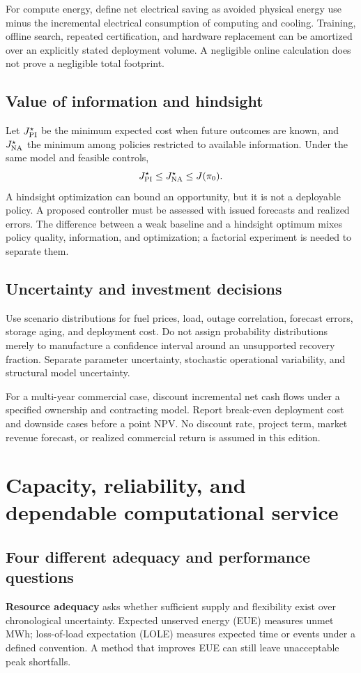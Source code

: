 \documentclass[11pt,letterpaper]{article}
\begin{document}
For compute energy, define net electrical saving as avoided physical energy use minus the incremental electrical consumption of computing and cooling. Training, offline search, repeated certification, and hardware replacement can be amortized over an explicitly stated deployment volume. A negligible online calculation does not prove a negligible total footprint.

\subsection{Value of information and hindsight}
Let $J^\star_{\rm PI}$ be the minimum expected cost when future outcomes are known, and $J^\star_{\rm NA}$ the minimum among policies restricted to available information. Under the same model and feasible controls,
\[
 J^\star_{\rm PI}\le J^\star_{\rm NA}\le J(\pi_0).
\]
A hindsight optimization can bound an opportunity, but it is not a deployable policy. A proposed controller must be assessed with issued forecasts and realized errors. The difference between a weak baseline and a hindsight optimum mixes policy quality, information, and optimization; a factorial experiment is needed to separate them.

\subsection{Uncertainty and investment decisions}
Use scenario distributions for fuel prices, load, outage correlation, forecast errors, storage aging, and deployment cost. Do not assign probability distributions merely to manufacture a confidence interval around an unsupported recovery fraction. Separate parameter uncertainty, stochastic operational variability, and structural model uncertainty.

For a multi-year commercial case, discount incremental net cash flows under a specified ownership and contracting model. Report break-even deployment cost and downside cases before a point NPV. No discount rate, project term, market revenue forecast, or realized commercial return is assumed in this edition.

\section{Capacity, reliability, and dependable computational service}
\label{sec:reliability}
\subsection{Four different adequacy and performance questions}
\textbf{Resource adequacy} asks whether sufficient supply and flexibility exist over chronological uncertainty. Expected unserved energy (EUE) measures unmet MWh; loss-of-load expectation (LOLE) measures expected time or events under a defined convention. A method that improves EUE can still leave unacceptable peak shortfalls.
\end{document}
